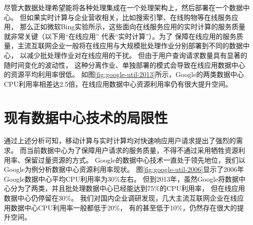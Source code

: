 尽管大数据处理希望能将各种处理集成在一个处理架构上，然后部署在一个数据中心。
但如果实时计算与企业营收相关，比如搜索引擎、在线购物等在线服务应用，
那么正如微软Bing实验所示，这些面向在线服务应用的实时计算的服务质量就非常关键（以下用“在线应用” 代表“实时计算”）。为了
保障在线应用的服务质量，主流互联网企业一般将在线应用与大规模批处理作业分别部署到不同的数据中心，
以减少批处理作业对在线应用的干扰。
但由于用户查询请求数量具有显著的随时间变化的波动性，
这种分离作业、单独部署的模式会导致在线应用数据中心的资源平均利用率很低。
如图\ref{fig:google-util-2013}所示，Google的两类数据中心CPU利用率相差达2.5倍，在线应用数据中心资源利用率仍有很大提升空间。




\section{现有数据中心技术的局限性}

通过上述分析可知，移动计算与实时计算均对快速响应用户请求提出了强烈的需求。
而当前数据中心为了保障用户请求的服务质量，不得不通过采用牺牲资源利用率、保留过量资源的方式。
Google的数据中心技术一直处于领先地位，我们以Google为例分析数据中心资源利用率现状。
图\ref{fig:google-util-2006}显示了2006年Google数据中心平均CPU利用率为30\%左右。
但到2013年，虽然Google将数据中心分为了两类，并且批处理数据中心已经能达到75\%的CPU利用率，
但在线应用数据中心仍停留在30\%。
我们对国内企业调研发现，几大主流互联网企业在线应用数据中心CPU利用率一般都低于20\%，
有的甚至低于10\%，仍然存在很大的提升空间。

